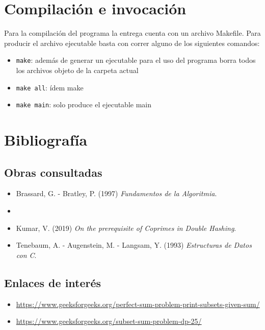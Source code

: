 \documentclass[11pt]{article}
\begin{document}
\section{Compilaci\'on e invocaci\'on}
Para la compilaci\'on del programa la entrega cuenta con un archivo Makefile. Para producir el archivo ejecutable basta 
con correr alguno de los siguientes comandos: 

\begin{itemize}
    \item \verb|make|: adem\'as de generar un ejecutable para el uso del programa borra todos los archivos objeto de la carpeta actual
    \item \verb|make all|: \'idem make
    \item \verb|make main|: solo produce el ejecutable main
\end{itemize}

\section{Bibliograf\'ia}

\subsection{Obras consultadas}
\begin{itemize}
    \item Brassard, G. - Bratley, P. (1997) \emph{Fundamentos de la Algoritmia}.
    \item 
    \item Kumar, V. (2019) \emph{On the prerequisite of Coprimes in Double Hashing}.
    \item Tenebaum, A. - Augenstein, M. - Langsam, Y. (1993) \emph{Estructuras de Datos con C}.
\end{itemize}

\subsection{Enlaces de inter\'es}
\begin{itemize}
    \item \href{https://www.geeksforgeeks.org/perfect-sum-problem-print-subsets-given-sum/}{https://www.geeksforgeeks.org/perfect-sum-problem-print-subsets-given-sum/}
    \item \href{https://www.geeksforgeeks.org/subset-sum-problem-dp-25/}{https://www.geeksforgeeks.org/subset-sum-problem-dp-25/}
\end{itemize}
\end{document}
